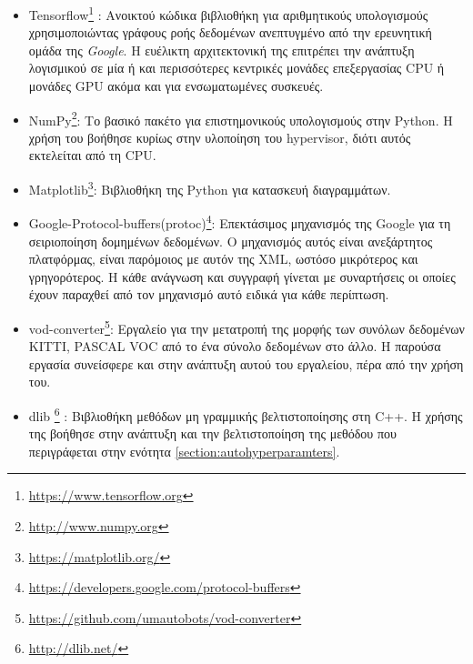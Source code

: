 \begin{itemize}
    \item Tensorflow\footnote{\url{https://www.tensorflow.org}} \cite{34}: Ανοικτού κώδικα βιβλιοθήκη για αριθμητικούς υπολογισμούς χρησιμοποιώντας γράφους ροής δεδομένων ανεπτυγμένο από την ερευνητική ομάδα της \textit{Google}. Η ευέλικτη αρχιτεκτονική της επιτρέπει την ανάπτυξη λογισμικού σε μία ή και περισσότερες κεντρικές μονάδες επεξεργασίας CPU ή μονάδες GPU ακόμα και για ενσωματωμένες συσκευές.
    \item NumPy\footnote{\url{http://www.numpy.org}}: Το βασικό πακέτο για επιστημονικούς υπολογισμούς στην Python. Η χρήση του βοήθησε κυρίως στην υλοποίηση του hypervisor, διότι αυτός εκτελείται από τη CPU.
    \item Matplotlib\footnote{\url{https://matplotlib.org/}}: Βιβλιοθήκη της Python για κατασκευή διαγραμμάτων.
    \item Google-Protocol-buffers(protoc)\footnote{\url{https://developers.google.com/protocol-buffers}}: Επεκτάσιμος μηχανισμός της Google για τη σειριοποίηση δομημένων δεδομένων. Ο μηχανισμός αυτός είναι ανεξάρτητος πλατφόρμας, είναι παρόμοιος με αυτόν της XML, ωστόσο μικρότερος και γρηγορότερος. Η κάθε ανάγνωση και συγγραφή γίνεται με συναρτήσεις οι οποίες έχουν παραχθεί από τον μηχανισμό αυτό ειδικά για κάθε περίπτωση. 
    \item vod-converter\footnote{\url{https://github.com/umautobots/vod-converter}}: Εργαλείο για την μετατροπή της μορφής των συνόλων δεδομένων KITTI, PASCAL VOC από το ένα σύνολο δεδομένων στο άλλο. Η παρούσα εργασία συνείσφερε και στην ανάπτυξη αυτού του εργαλείου, πέρα από την χρήση του.
    \item dlib \footnote{\url{http://dlib.net/}} \cite{83}: Βιβλιοθήκη μεθόδων μη γραμμικής βελτιστοποίησης στη C++. Η χρήσης της βοήθησε στην ανάπτυξη και την βελτιστοποίηση της μεθόδου που περιγράφεται στην ενότητα \ref{section:autohyperparamters}.
\end{itemize}

